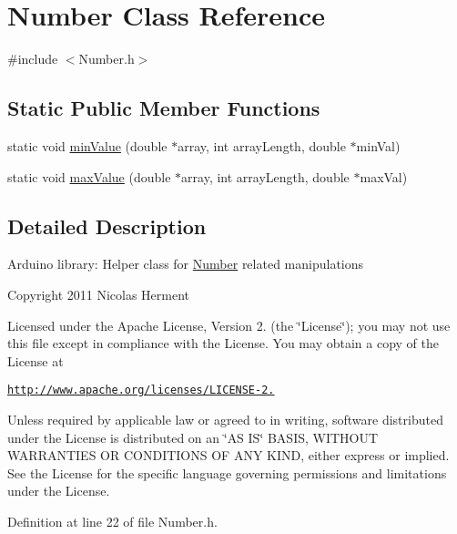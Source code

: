 \hypertarget{class_number}{
\section{\-Number \-Class \-Reference}
\label{class_number}
}


{\ttfamily \#include $<$\-Number.\-h$>$}

\subsection*{\-Static \-Public \-Member \-Functions}
\begin{DoxyCompactItemize}
\item 
static void \hyperlink{class_number_a235ac8e6c64e2560a35b88004bbb82f0}{min\-Value} (double $\ast$array, int array\-Length, double $\ast$min\-Val)
\item 
static void \hyperlink{class_number_a87dfc137dbde376d52e71ca615f280b5}{max\-Value} (double $\ast$array, int array\-Length, double $\ast$max\-Val)
\end{DoxyCompactItemize}


\subsection{\-Detailed \-Description}
\-Arduino library\-: \-Helper class for \hyperlink{class_number}{\-Number} related manipulations

\-Copyright 2011 \-Nicolas \-Herment

\-Licensed under the \-Apache \-License, \-Version 2. (the \char`\"{}\-License\char`\"{}); you may not use this file except in compliance with the \-License. \-You may obtain a copy of the \-License at

\href{http://www.apache.org/licenses/LICENSE-2.0}{\tt http\-://www.\-apache.\-org/licenses/\-L\-I\-C\-E\-N\-S\-E-\/2.}

\-Unless required by applicable law or agreed to in writing, software distributed under the \-License is distributed on an \char`\"{}\-A\-S I\-S\char`\"{} \-B\-A\-S\-I\-S, \-W\-I\-T\-H\-O\-U\-T \-W\-A\-R\-R\-A\-N\-T\-I\-E\-S \-O\-R \-C\-O\-N\-D\-I\-T\-I\-O\-N\-S \-O\-F \-A\-N\-Y \-K\-I\-N\-D, either express or implied. \-See the \-License for the specific language governing permissions and limitations under the \-License. 

\-Definition at line 22 of file \-Number.\-h.



